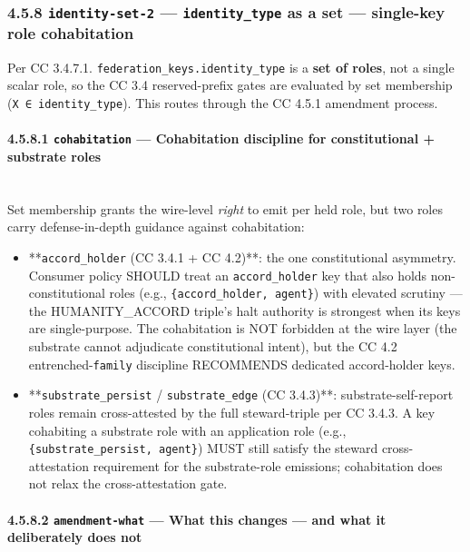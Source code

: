 \documentclass[11pt]{article}
\begin{document}
\subsubsection*{4.5.8 \texttt{identity-set-2} — \texttt{identity\_type} as a set — single-key role cohabitation}


Per CC 3.4.7.1. \texttt{federation\_keys.identity\_type} is a \textbf{set of roles}, not a single scalar role, so the CC 3.4 reserved-prefix gates are evaluated by set membership (\texttt{X ∈ identity\_type}). This routes through the CC 4.5.1 amendment process.


\paragraph{4.5.8.1 \texttt{cohabitation} — Cohabitation discipline for constitutional + substrate roles}\mbox{}\\


Set membership grants the wire-level \textit{right} to emit per held role, but two roles carry defense-in-depth guidance against cohabitation:


\begin{itemize}\setlength\itemsep{0pt}
\item **\texttt{accord\_holder} (CC 3.4.1 + CC 4.2)**: the one constitutional asymmetry. Consumer policy SHOULD treat an \texttt{accord\_holder} key that also holds non-constitutional roles (e.g., \texttt{\{accord\_holder, agent\}}) with elevated scrutiny — the HUMANITY\_ACCORD triple's halt authority is strongest when its keys are single-purpose. The cohabitation is NOT forbidden at the wire layer (the substrate cannot adjudicate constitutional intent), but the CC 4.2 entrenched-\texttt{family} discipline RECOMMENDS dedicated accord-holder keys.
\item **\texttt{substrate\_persist} / \texttt{substrate\_edge} (CC 3.4.3)**: substrate-self-report roles remain cross-attested by the full steward-triple per CC 3.4.3. A key cohabiting a substrate role with an application role (e.g., \texttt{\{substrate\_persist, agent\}}) MUST still satisfy the steward cross-attestation requirement for the substrate-role emissions; cohabitation does not relax the cross-attestation gate.
\end{itemize}


\paragraph{4.5.8.2 \texttt{amendment-what} — What this changes — and what it deliberately does not}\mbox{}\\
\end{document}

